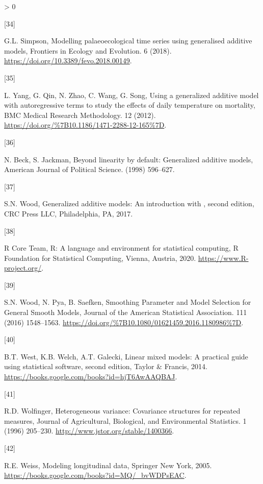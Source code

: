 \documentclass[
]{article}
\newlength{\cslhangindent}
\newlength{\csllabelwidth}
\newenvironment{CSLReferences}[2] %
 {%
  \setlength{\parindent}{0pt}
  \ifodd #1 \everypar{\setlength{\hangindent}{\cslhangindent}}\ignorespaces\fi
  \ifnum #2 > 0
  \setlength{\parskip}{#2\baselineskip}
  \fi
 }%
 {}
\newcommand{\CSLLeftMargin}[1]{\parbox[t]{\csllabelwidth}{#1}}
\newcommand{\CSLRightInline}[1]{\parbox[t]{\linewidth - \csllabelwidth}{#1}\break}
\begin{document}
\begin{CSLReferences}{0}{0}
\leavevmode\hypertarget{ref-simpson2018}{}%
\CSLLeftMargin{{[}34{]} }
\CSLRightInline{G.L. Simpson, Modelling palaeoecological time series using generalised additive models, Frontiers in Ecology and Evolution. 6 (2018). \url{https://doi.org/10.3389/fevo.2018.00149}.}

\leavevmode\hypertarget{ref-yang2012}{}%
\CSLLeftMargin{{[}35{]} }
\CSLRightInline{L. Yang, G. Qin, N. Zhao, C. Wang, G. Song, {Using a generalized additive model with autoregressive terms to study the effects of daily temperature on mortality}, {BMC Medical Research Methodology}. {12} (2012). \url{https://doi.org/\%7B10.1186/1471-2288-12-165\%7D}.}

\leavevmode\hypertarget{ref-beck1998}{}%
\CSLLeftMargin{{[}36{]} }
\CSLRightInline{N. Beck, S. Jackman, Beyond linearity by default: Generalized additive models, American Journal of Political Science. (1998) 596--627.}

\leavevmode\hypertarget{ref-wood2017}{}%
\CSLLeftMargin{{[}37{]} }
\CSLRightInline{S.N. Wood, Generalized additive models: An introduction with {}, second edition, CRC Press LLC, Philadelphia, PA, 2017.}

\leavevmode\hypertarget{ref-r}{}%
\CSLLeftMargin{{[}38{]} }
\CSLRightInline{R Core Team, R: A language and environment for statistical computing, R Foundation for Statistical Computing, Vienna, Austria, 2020. \url{https://www.R-project.org/}.}

\leavevmode\hypertarget{ref-wood2016}{}%
\CSLLeftMargin{{[}39{]} }
\CSLRightInline{S.N. Wood, N. Pya, B. Saefken, {Smoothing Parameter and Model Selection for General Smooth Models}, {Journal of the American Statistical Association}. {111} (2016) 1548--1563. \url{https://doi.org/\%7B10.1080/01621459.2016.1180986\%7D}.}

\leavevmode\hypertarget{ref-west2014}{}%
\CSLLeftMargin{{[}40{]} }
\CSLRightInline{B.T. West, K.B. Welch, A.T. Galecki, Linear mixed models: A practical guide using statistical software, second edition, Taylor \& Francis, 2014. \url{https://books.google.com/books?id=hjT6AwAAQBAJ}.}

\leavevmode\hypertarget{ref-wolfinger1996}{}%
\CSLLeftMargin{{[}41{]} }
\CSLRightInline{R.D. Wolfinger, Heterogeneous variance: Covariance structures for repeated measures, Journal of Agricultural, Biological, and Environmental Statistics. 1 (1996) 205--230. \url{http://www.jstor.org/stable/1400366}.}

\leavevmode\hypertarget{ref-weiss2005}{}%
\CSLLeftMargin{{[}42{]} }
\CSLRightInline{R.E. Weiss, Modeling longitudinal data, Springer New York, 2005. \url{https://books.google.com/books?id=MQ/_bvWDPsEAC}.}


\end{CSLReferences}
\end{document}
